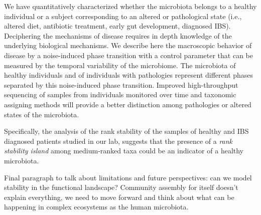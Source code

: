 We have quantitatively characterized whether the microbiota belongs to a healthy individual or a subject corresponding to an altered or pathological state (i.e., altered diet, antibiotic treatment, early gut development, diagnosed IBS). Deciphering the mechanisms of disease requires in depth knowledge of the underlying biological mechanisms. We describe here the macroscopic behavior of disease by a noise-induced phase transition with a control parameter that can be measured by the temporal variability of the microbiome. The microbiota of healthy individuals and of individuals with pathologies represent different phases separated by this noise-induced phase transition. Improved high-throughput sequencing of samples from individuals monitored over time and taxonomic assigning methods will provide a better distinction among pathologies or altered states of the microbiota.

Specifically, the analysis of the rank stability of the samples of healthy and IBS diagnosed patients studied in our lab\cite{IBS}, suggests that the presence of a \emph{rank stability island} among medium-ranked taxa could be an indicator of a healthy microbiota. 

Final paragraph to talk about limitations and future perspectives: can we model stability in the functional landscape? Community assembly for itself doesn't explain everything, we need to move forward and think about what can be happening in complex ecosystems as the human microbiota.